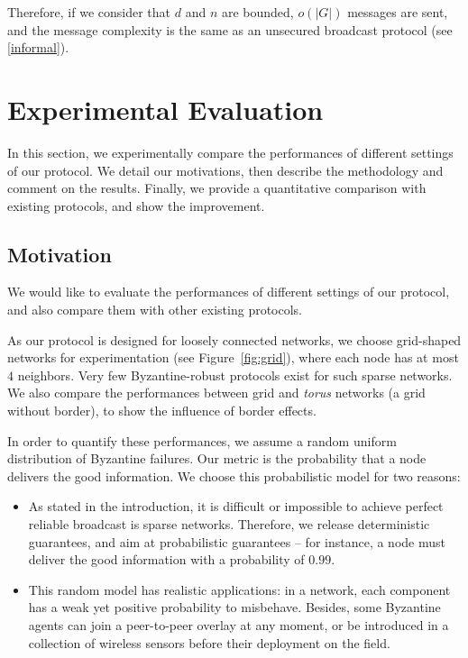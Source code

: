 \documentclass[a4paper,11pt]{article}
\begin{document}
Therefore, if we consider that $d$ and $n$ are bounded, $o(|G|)$ messages are sent, and the message complexity is the same as an unsecured broadcast protocol (see \ref{informal}).

\section{Experimental Evaluation}
\label{sec_exp}

In this section, we experimentally compare the performances of different settings of our protocol. We detail our motivations, then describe the methodology and comment on the results. Finally, we provide a quantitative comparison with existing protocols, and show the improvement.

\subsection{Motivation}

We would like to evaluate the performances of different settings of our protocol, and also compare them with other existing protocols.

As our protocol is designed for loosely connected networks, we choose grid-shaped networks for experimentation (see Figure~\ref{fig:grid}), where each node has at most $4$ neighbors. Very few Byzantine-robust protocols exist for such sparse networks.
We also compare the performances between grid and \emph{torus} networks (a grid without border), to show the influence of border effects.

In order to quantify these performances, we assume a random uniform distribution of Byzantine failures. Our metric is the probability that a node delivers the good information. We choose this probabilistic model for two reasons:

\begin{itemize}
\item As stated in the introduction, it is difficult or impossible to achieve perfect reliable broadcast is sparse networks. Therefore, we release deterministic guarantees, and aim at probabilistic guarantees -- for instance, a node must deliver the good information with a probability of $0.99$.
\item This random model has realistic applications:
in a network, each component has a weak yet positive probability to misbehave. Besides, some Byzantine agents can join a peer-to-peer overlay at any moment, or be introduced in a collection of wireless sensors before their deployment on the field.
\end{itemize}
\end{document}
